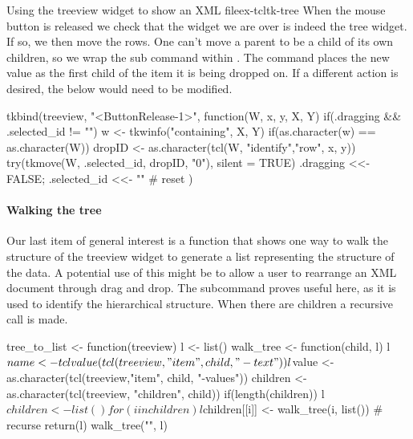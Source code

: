 \begin{example}{Using the treeview widget to show an XML file}{ex-tcltk-tree}
When the mouse button is released we check that the widget we are over
is indeed the tree widget. If so, we then move the rows. One can't
move a parent to be a child of its own children, so we wrap the
 sub command within . The
 command places the new value as the first child of the
item it is being dropped on. If a different action is desired, the
 below would need to be modified.
\begin{Schunk}
\begin{Sinput}
 tkbind(treeview, "<ButtonRelease-1>", function(W, x, y, X, Y) {
   if(.dragging && .selected_id != "") {
     w <- tkwinfo("containing", X, Y)
     if(as.character(w) == as.character(W)) {
       dropID <- as.character(tcl(W, "identify","row", x, y))
       try(tkmove(W, .selected_id, dropID, "0"), silent = TRUE)
     }
   }
   .dragging <<- FALSE; .selected_id <<- "" # reset
 })
\end{Sinput}
\end{Schunk}

\paragraph{Walking the tree}
Our last item of general interest is a function that shows one way to
walk the structure of the treeview widget to generate a list
representing the structure of the data.  A potential use of this might
be to allow a user to rearrange an XML document through drag and drop.
The subcommand  proves useful here,
as it is used to identify the hierarchical structure. When there are children a recursive call is made.



\begin{Schunk}
\begin{Sinput}
 tree_to_list <- function(treeview) {
   l <- list()
   walk_tree <- function(child, l) {
     l$name <- tclvalue(tcl(treeview,"item", child, "-text"))
     l$value <- as.character(tcl(treeview,"item", child, "-values"))
     children <- as.character(tcl(treeview, "children", child)) 
     if(length(children)) {
       l$children <- list()
       for(i in children) 
         l$children[[i]] <- walk_tree(i, list()) # recurse
     }
     return(l)
   }
   walk_tree("", l)
 }
 
\end{Sinput}
\end{Schunk}
\end{example}

